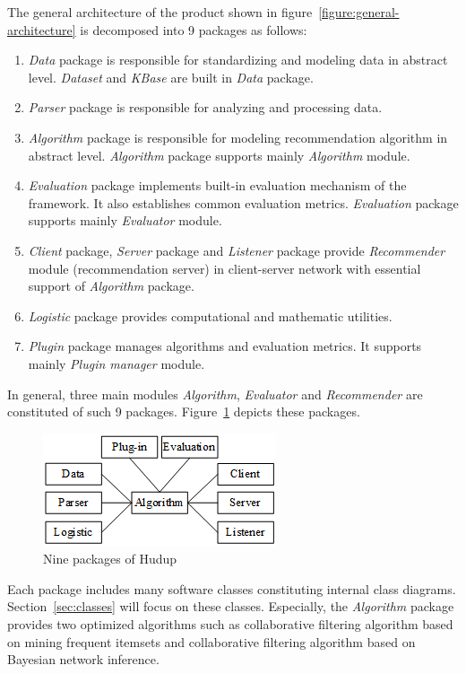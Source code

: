 \documentclass[a4paper,twoside]{article}
\begin{document}
The general architecture of the product shown in figure~\ref{figure:general-architecture} is decomposed into 9 packages as follows:
\begin{enumerate}
\item \textit{Data} package is responsible for standardizing and modeling data in abstract level. \textit{Dataset} and \textit{KBase} are built in \textit{Data} package.
\item \textit{Parser} package is responsible for analyzing and processing data.
\item \textit{Algorithm} package is responsible for modeling recommendation algorithm in abstract level. \textit{Algorithm} package supports mainly \textit{Algorithm} module.
\item \textit{Evaluation} package implements built-in evaluation mechanism of the framework. It also establishes common evaluation metrics. \textit{Evaluation} package supports mainly \textit{Evaluator} module.
\item \textit{Client} package, \textit{Server} package and \textit{Listener} package provide \textit{Recommender} module (recommendation server) in client-server network with essential support of \textit{Algorithm} package.
\item \textit{Logistic} package provides computational and mathematic utilities.
\item \textit{Plugin} package manages algorithms and evaluation metrics. It supports mainly \textit{Plugin manager} module.
\end{enumerate}
In general, three main modules \textit{Algorithm}, \textit{Evaluator} and \textit{Recommender} are constituted of such 9 packages. Figure~\ref{figure:9-packges} depicts these packages.
\begin{figure}
\centering
\includegraphics{NinePackages.png}
\caption{Nine packages of Hudup}
\label{figure:9-packges}
\end{figure}
Each package includes many software classes constituting internal class diagrams. Section~\ref{sec:classes} will focus on these classes. Especially, the \textit{Algorithm} package provides two optimized algorithms such as collaborative filtering algorithm based on mining frequent itemsets and collaborative filtering algorithm based on Bayesian network inference.
\end{document}
